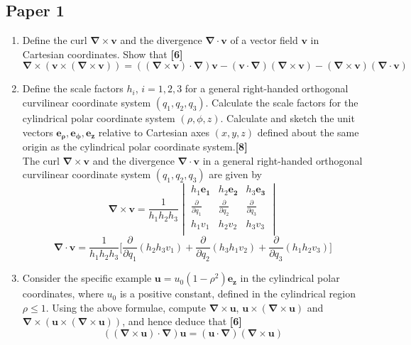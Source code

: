 \documentclass[a4paper]{article}
\begin{document}
\subsection{Paper 1}
\begin{qns}\leavevmode
\begin{enumerate}[label=(\alph*)]
    \item Define the curl $\boldsymbol{\nabla}\times\mathbf{v}$ and the divergence $\boldsymbol{\nabla}\cdot\mathbf{v}$ of a vector field $\mathbf{v}$ in Cartesian coordinates. Show that \hfill \textbf{[6]}
$$\boldsymbol{\nabla}\times(\mathbf{v}\times(\boldsymbol{\nabla}\times\mathbf{v}))=((\boldsymbol{\nabla}\times\mathbf{v})\cdot\boldsymbol{\nabla})\mathbf{v}-(\mathbf{v}\cdot\boldsymbol{\nabla})(\boldsymbol{\nabla}\times\mathbf{v})-(\boldsymbol{\nabla}\times\mathbf{v})(\boldsymbol{\nabla}\cdot\mathbf{v})$$
\item Define the scale factors $h_i$, $i=1,2,3$ for a general right-handed orthogonal curvilinear coordinate system $(q_1,q_2,q_3)$. Calculate the scale factors for the cylindrical polar coordinate system $(\rho,\phi,z)$. Calculate and sketch the unit vectors $\boldsymbol{e_\rho},\boldsymbol{e_\phi},\boldsymbol{e_z}$ relative to Cartesian axes $(x,y,z)$ defined about the same origin as the cylindrical polar coordinate system.\hfill \textbf{[8]}\\[5pt]
The curl $\boldsymbol{\nabla}\times\mathbf{v}$ and the divergence $\boldsymbol{\nabla}\cdot\mathbf{v}$ in a general right-handed orthogonal curvilinear coordinate system $(q_1,q_2,q_3)$ are given by
$$\boldsymbol{\nabla}\times\mathbf{v}=\frac{1}{h_1h_2h_3}\begin{vmatrix}h_1\mathbf{e_1}&h_2\mathbf{e_2}&h_3\mathbf{e_3}\\\frac{\partial}{\partial q_1}&\frac{\partial}{\partial q_2}&\frac{\partial}{\partial q_3}\\h_1v_1&h_2v_2&h_3v_3\\\end{vmatrix}$$
$$\boldsymbol{\nabla}\cdot\mathbf{v}=\frac{1}{h_1h_2h_3}\bigg[\frac{\partial}{\partial q_1}(h_2h_3v_1)+\frac{\partial}{\partial q_2}(h_3h_1v_2)+\frac{\partial}{\partial q_3}(h_1h_2v_3)\bigg]$$
\item Consider the specific example $\mathbf{u}=u_0(1-\rho^2)\mathbf{e_z}$ in the cylindrical polar coordinates, where $u_0$ is a positive constant, defined in the cylindrical region $\rho\leq 1$. Using the above formulae, compute $\boldsymbol{\nabla}\times\mathbf{u}$, $\mathbf{u}\times(\boldsymbol{\nabla}\times\mathbf{u})$ and $\boldsymbol{\nabla}\times(\mathbf{u}\times(\boldsymbol{\nabla}\times\mathbf{u}))$, and hence deduce that \hfill \textbf{[6]}
$$((\boldsymbol{\nabla}\times\mathbf{u})\cdot\boldsymbol{\nabla})\mathbf{u}=(\mathbf{u}\cdot\boldsymbol{\nabla})(\boldsymbol{\nabla}\times\mathbf{u})$$
\end{enumerate}
\end{qns}
\end{document}
